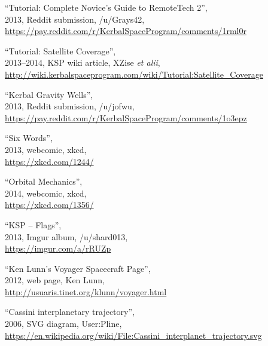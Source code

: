 \begin{thebibliography}{99}
“Tutorial: Complete Novice's Guide to RemoteTech 2”, \\
2013, Reddit submission, /u/Grays42, \\
\url{https://pay.reddit.com/r/KerbalSpaceProgram/comments/1rml0r}

“Tutorial: Satellite Coverage”, \\
2013--2014, KSP wiki article, XZise \emph{et alii}, \\
{\small\url{http://wiki.kerbalspaceprogram.com/wiki/Tutorial:Satellite_Coverage}}

“Kerbal Gravity Wells”, \\
2013, Reddit submission, /u/jofwu, \\
\url{https://pay.reddit.com/r/KerbalSpaceProgram/comments/1o3epz}

“Six Words”, \\
2013, webcomic, xkcd, \\
\url{https://xkcd.com/1244/}

“Orbital Mechanics”, \\
2014, webcomic, xkcd, \\
\url{https://xkcd.com/1356/}

“KSP -- Flags”, \\
2013, Imgur album, /u/shard013, \\
\url{https://imgur.com/a/rRUZp}

“Ken Lunn's Voyager Spacecraft Page”, \\
2012, web page, Ken Lunn, \\
\url{http://usuaris.tinet.org/klunn/voyager.html}

“Cassini interplanetary trajectory”, \\
2006, SVG diagram, User:Pline, \\
{\footnotesize\url{https://en.wikipedia.org/wiki/File:Cassini_interplanet_trajectory.svg}}


\end{thebibliography}
